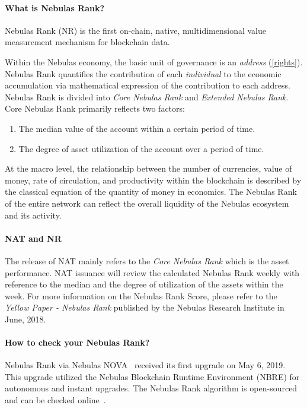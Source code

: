 \begin{center}
\colorbox{yellow!30}{
\begin{minipage}[c]{.8\textwidth}
	\paragraph{What is Nebulas Rank?}
	Nebulas Rank (NR) is the first on-chain, native, multidimensional value measurement mechanism for blockchain data.

  Within the Nebulas economy, the basic unit of governance is an \emph{address}
  (\ref{rights}). Nebulas Rank quantifies the contribution of each
  \emph{individual} to the economic accumulation via mathematical expression of
  the contribution to each address. Nebulas Rank is divided into \emph{Core
  Nebulas Rank} and \emph{Extended Nebulas Rank}. Core Nebulas Rank primarily reflects two factors:

	\begin{enumerate}
		\item The median value of the account within a certain period of time.
		\item The degree of asset utilization of the account over a period of time.
	\end{enumerate}

	At the macro level, the relationship between the number of currencies, value of money, rate of circulation, and productivity within the blockchain is described by the classical equation of the quantity of money in economics. The Nebulas Rank of the entire network can reflect the overall liquidity of the Nebulas ecosystem and its activity.


	\paragraph{NAT and NR}

  The release of NAT mainly refers to the \emph{Core Nebulas Rank} which is the asset performance. NAT issuance will review the calculated Nebulas Rank weekly with reference to the median and the degree of utilization of the assets within the week. For more information on the Nebulas Rank Score, please refer to the \textit{Yellow Paper - Nebulas Rank} published by the Nebulas Research Institute in June, 2018.


	\paragraph{How to check your Nebulas Rank?}

Nebulas Rank via Nebulas NOVA~\cite{nova} received its first upgrade on May 6, 2019. This upgrade utilized the Nebulas Blockchain Runtime Environment (NBRE) for autonomous and instant upgrades. The Nebulas Rank algorithm is open-sourced and can be checked online~\cite{CheckNR}.


\end{minipage}}
\end{center}

